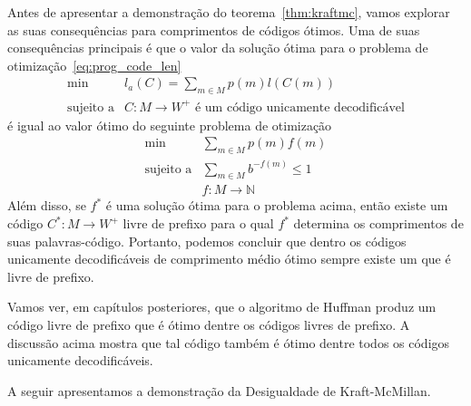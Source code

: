 Antes de apresentar a demonstração do teorema~\ref{thm:kraftmc}, vamos
explorar as suas consequências para comprimentos de códigos ótimos. 
Uma de suas consequências principais é que o valor da solução
ótima para o problema de otimização~\ref{eq:prog_code_len}
\begin{equation*} 
  \begin{array}{rl}
    \min & l_a(C) = \sum_{m\in M} p(m) l(C(m))\\
    \text{sujeito a} &C: M \to W^+ \text{ é um código unicamente decodificável}
  \end{array}
\end{equation*}
é igual ao valor ótimo do seguinte problema de otimização
\begin{equation*} 
  \begin{array}{rl}
    \min & \sum_{m\in M} p(m) f(m)\\
    \text{sujeito a} &\sum_{m \in M} b^{-f(m)} \leq 1\\
    & f:M\to\mathbb{N}
  \end{array}
\end{equation*}
Além disso, se $f^*$ é uma solução ótima para o problema acima, então
existe um código $C^*: M \to W^+$ livre de prefixo para o qual $f^*$
determina os comprimentos de suas palavras-código. Portanto, podemos
concluir que dentro os códigos unicamente decodificáveis de
comprimento médio ótimo sempre existe um que é livre de prefixo.
 
Vamos ver, em capítulos posteriores, que o algoritmo de Huffman produz
um código livre de prefixo que é ótimo dentre os códigos livres de
prefixo. A discussão acima mostra que tal código também é ótimo dentre
todos os códigos unicamente decodificáveis.

A seguir apresentamos a demonstração da Desigualdade de
Kraft-McMillan.

